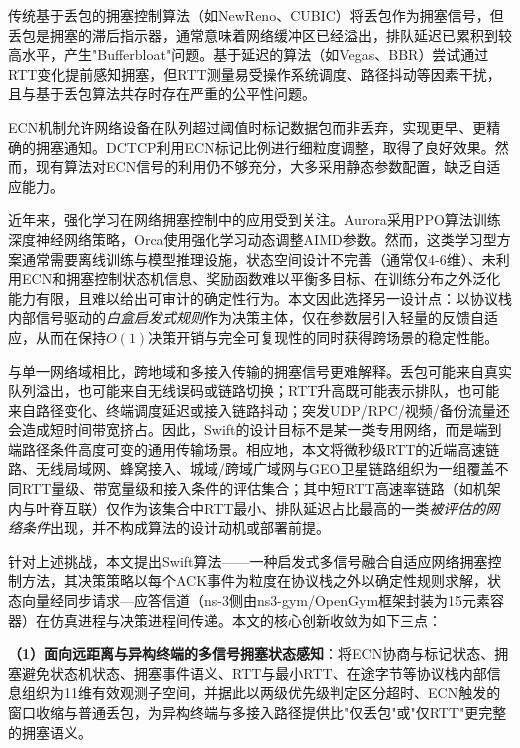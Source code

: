 \documentclass[10pt,twocolumn]{article}
\begin{document}
传统基于丢包的拥塞控制算法（如NewReno\cite{newreno}、CUBIC\cite{cubic}）将丢包作为拥塞信号，但丢包是拥塞的滞后指示器，通常意味着网络缓冲区已经溢出，排队延迟已累积到较高水平，产生"Bufferbloat"问题\cite{bufferbloat}。基于延迟的算法（如Vegas\cite{vegas}、BBR\cite{bbr}）尝试通过RTT变化提前感知拥塞，但RTT测量易受操作系统调度、路径抖动等因素干扰，且与基于丢包算法共存时存在严重的公平性问题\cite{bbrfairness}。

ECN机制\cite{rfc3168}允许网络设备在队列超过阈值时标记数据包而非丢弃，实现更早、更精确的拥塞通知。DCTCP\cite{dctcp}利用ECN标记比例进行细粒度调整，取得了良好效果。然而，现有算法对ECN信号的利用仍不够充分，大多采用静态参数配置，缺乏自适应能力。

近年来，强化学习在网络拥塞控制中的应用受到关注\cite{rlcc}。Aurora\cite{aurora}采用PPO算法训练深度神经网络策略，Orca\cite{orca}使用强化学习动态调整AIMD参数。然而，这类学习型方案通常需要离线训练与模型推理设施，状态空间设计不完善（通常仅4-6维）、未利用ECN和拥塞控制状态机信息、奖励函数难以平衡多目标、在训练分布之外泛化能力有限，且难以给出可审计的确定性行为。本文因此选择另一设计点：以协议栈内部信号驱动的\emph{白盒启发式规则}作为决策主体，仅在参数层引入轻量的反馈自适应，从而在保持$O(1)$决策开销与完全可复现性的同时获得跨场景的稳定性能。

与单一网络域相比，跨地域和多接入传输的拥塞信号更难解释。丢包可能来自真实队列溢出，也可能来自无线误码或链路切换；RTT升高既可能表示排队，也可能来自路径变化、终端调度延迟或接入链路抖动；突发UDP/RPC/视频/备份流量还会造成短时间带宽挤占。因此，Swift的设计目标不是某一类专用网络，而是端到端路径条件高度可变的通用传输场景。相应地，本文将微秒级RTT的近端高速链路、无线局域网、蜂窝接入、城域/跨域广域网与GEO卫星链路组织为一组覆盖不同RTT量级、带宽量级和接入条件的评估集合；其中短RTT高速率链路（如机架内与叶脊互联）仅作为该集合中RTT最小、排队延迟占比最高的一类\emph{被评估的网络条件}出现，并不构成算法的设计动机或部署前提。

针对上述挑战，本文提出Swift算法——一种启发式多信号融合自适应网络拥塞控制方法，其决策策略以每个ACK事件为粒度在协议栈之外以确定性规则求解，状态向量经同步请求—应答信道（ns-3侧由ns3-gym/OpenGym\cite{opengym}框架封装为15元素容器）在仿真进程与决策进程间传递。本文的核心创新收敛为如下三点：

\textbf{（1）面向远距离与异构终端的多信号拥塞状态感知}：将ECN协商与标记状态、拥塞避免状态机状态、拥塞事件语义、RTT与最小RTT、在途字节等协议栈内部信息组织为11维有效观测子空间，并据此以两级优先级判定区分超时、ECN触发的窗口收缩与普通丢包，为异构终端与多接入路径提供比"仅丢包"或"仅RTT"更完整的拥塞语义。
\end{document}
